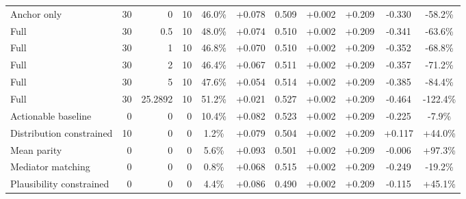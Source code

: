 \begin{table}[htbp]
\begin{tabular}{lrrrccccccc}
Anchor only & 30 & 0 & 10 & 46.0\% & +0.078 & 0.509 & +0.002 & +0.209 & -0.330 & -58.2\% \\
Full & 30 & 0.5 & 10 & 48.0\% & +0.074 & 0.510 & +0.002 & +0.209 & -0.341 & -63.6\% \\
Full & 30 & 1 & 10 & 46.8\% & +0.070 & 0.510 & +0.002 & +0.209 & -0.352 & -68.8\% \\
Full & 30 & 2 & 10 & 46.4\% & +0.067 & 0.511 & +0.002 & +0.209 & -0.357 & -71.2\% \\
Full & 30 & 5 & 10 & 47.6\% & +0.054 & 0.514 & +0.002 & +0.209 & -0.385 & -84.4\% \\
Full & 30 & 25.2892 & 10 & 51.2\% & +0.021 & 0.527 & +0.002 & +0.209 & -0.464 & -122.4\% \\
Actionable baseline & 0 & 0 & 0 & 10.4\% & +0.082 & 0.523 & +0.002 & +0.209 & -0.225 & -7.9\% \\
Distribution constrained & 10 & 0 & 0 & 1.2\% & +0.079 & 0.504 & +0.002 & +0.209 & +0.117 & +44.0\% \\
Mean parity & 0 & 0 & 0 & 5.6\% & +0.093 & 0.501 & +0.002 & +0.209 & -0.006 & +97.3\% \\
Mediator matching & 0 & 0 & 0 & 0.8\% & +0.068 & 0.515 & +0.002 & +0.209 & -0.249 & -19.2\% \\
Plausibility constrained & 0 & 0 & 0 & 4.4\% & +0.086 & 0.490 & +0.002 & +0.209 & -0.115 & +45.1\% \\
\bottomrule
\end{tabular}
\end{table}